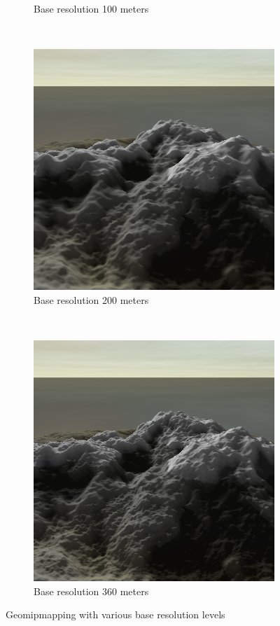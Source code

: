 \documentclass{article}
\begin{document}
\begin{figure}[H]
\begin{subfigure}[b]{0.45\textwidth}
        \caption{Base resolution 100 meters}
        \label{fig:image10}
    \end{subfigure}
    ~
    \begin{subfigure}[b]{0.45\textwidth}
        \centering
        \includegraphics[scale=0.25]{image20}
        \caption{Base resolution 200 meters}
        \label{fig:image20}
    \end{subfigure}
    ~
    \begin{subfigure}[b]{0.45\textwidth}
        \centering
        \includegraphics[scale=0.25]{image36}
        \caption{Base resolution 360 meters}
        \label{fig:image36}
    \end{subfigure}
    \caption{Geomipmapping with various base resolution levels}
    \label{fig:geomipmap}
\end{figure}
\end{document}

